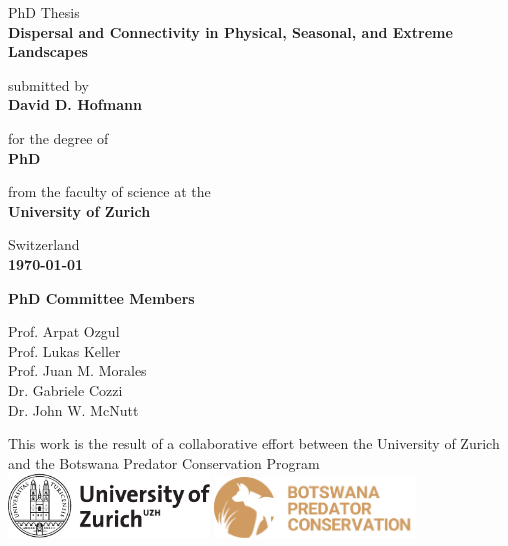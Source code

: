 \documentclass[../FinalThesis.tex]{subfiles}
\begin{document}
\begin{titlepage}
\begin{center}

\vspace*{1.5cm}
PhD Thesis\\
\textbf{\LARGE Dispersal and Connectivity in Physical, Seasonal, and Extreme Landscapes}

\vspace{1.5cm}
submitted by\\
\textbf{\large David D. Hofmann}

\vspace{0.5cm}
for the degree of\\
\textbf{\large PhD}

\vspace{0.5cm}
from the faculty of science at the\\
\textbf{\large University of Zurich}

\vspace{0.5cm}
Switzerland\\
\textbf{\large \today}

\vspace{1cm}
\textbf{\large PhD Committee Members\\}
\vspace{0.2cm}
\begin{onehalfspacing}
Prof. Arpat Ozgul\\
Prof. Lukas Keller\\
Prof. Juan M. Morales\\
Dr. Gabriele Cozzi\\
Dr. John W. McNutt\\
\end{onehalfspacing}

\vfill
This work is the result of a collaborative effort between the University of
Zurich and the Botswana Predator Conservation Program\\

\vspace{1.5cm}
\includegraphics[width=0.4\textwidth]{UZH}
\hspace{1cm}
\includegraphics[width=0.4\textwidth]{BPC}

\end{center}
\end{titlepage}
\end{document}

